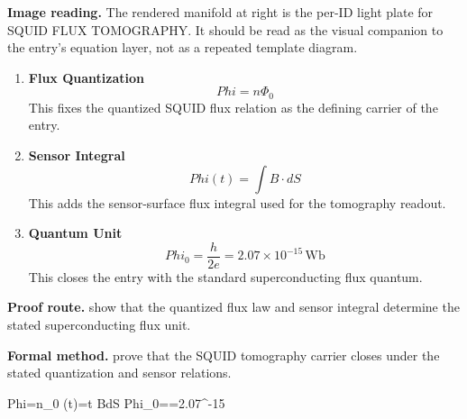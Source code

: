 \begin{samepage}
\noindent\begin{minipage}[t]{0.45\linewidth}
\vspace{0pt}
\raggedright
\scriptsize\textbf{Image reading.} The rendered manifold at right is the per-ID light plate for SQUID FLUX TOMOGRAPHY. It should be read as the visual companion to the entry's equation layer, not as a repeated template diagram.\par
\end{minipage}\hfill
\begin{minipage}[t]{0.53\linewidth}
\vspace*{-0.10in}
\raggedright
{}
\end{minipage}
\end{samepage}

\clearpage


\begin{enumerate}[leftmargin=1.6em,itemsep=9pt,topsep=6pt]
\item \textbf{Flux Quantization}
\[
Phi=n\Phi_{0}
\]
This fixes the quantized SQUID flux relation as the defining carrier of the entry.

\item \textbf{Sensor Integral}
\[
Phi(t)=\int B\cdot dS
\]
This adds the sensor-surface flux integral used for the tomography readout.

\item \textbf{Quantum Unit}
\[
Phi_{0}=\frac{h}{2e}=2.07\times 10^{-15}\,\mathrm{Wb}
\]
This closes the entry with the standard superconducting flux quantum.
\end{enumerate}

\textbf{Proof route.} show that the quantized flux law and sensor integral determine the stated superconducting flux unit.

\textbf{Formal method.} prove that the SQUID tomography carrier closes under the stated quantization and sensor relations.

\medskip
{}

\begin{tzpsnapshot}
\end{tzpsnapshot}

\tzpequationlinks
  {Phi=n\Phi_{0}}
  {\Phi(t)=\in t B\cdot dS}
  {Phi_{0}==2.07^{-15}\,}

